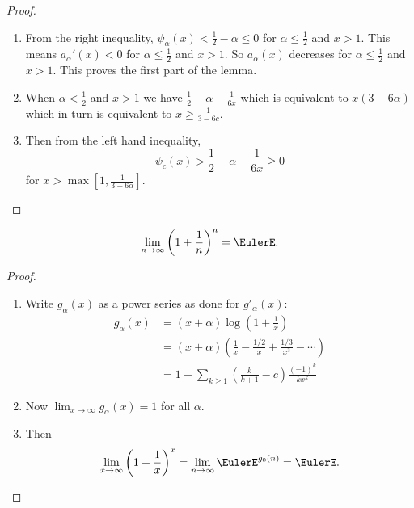 \documentclass[12pt]{article}
\begin{document}
\begin{proof}
\begin{enumerate}
        \item
            From the right inequality, \( \psi_{\alpha}(x) < \frac{1}{2}
            - \alpha \le 0 \) for \( \alpha \le \frac{1}{2} \) and \( x
            > 1 \).  This means \( a_{\alpha}'(x) < 0 \) for \( \alpha
            \le \frac{1}{2} \) and \( x > 1 \).  So \( a_{\alpha}(x) \)
            decreases for \( \alpha \le \frac{1}{2} \) and \( x > 1 \).
            This proves the first part of the lemma.
        \item
            When \( \alpha < \frac{1}{2} \) and \( x > 1 \) we have \(
            \frac{1}{2} - \alpha - \frac{1}{6x} \) which is equivalent
            to \( x(3 - 6 \alpha) \) which in turn is equivalent to \( x
            \ge \frac{1}{3 - 6c} \).
        \item
            Then from the left hand inequality,
            \[
                \psi_c(x) > \frac{1}{2} - \alpha - \frac{1}{6x} \ge 0
            \] for \( x > \max[1, \frac{1}{3-6\alpha}] \).
    \end{enumerate}
\end{proof}

\begin{corollary}
    \[
        \lim_{n \to \infty} \left( 1 + \frac{1}{n} \right)^n = \EulerE.
    \]
\end{corollary}

\begin{proof}
    \begin{enumerate}
        \item
            Write \( g_{\alpha}(x) \) as a power series as done for \(
            g'_{\alpha}(x) \):
            \begin{align*}
                g_{\alpha}(x) &= (x + \alpha) \log \left( 1 + \frac{1}{x}
                \right) \\
                &= (x + \alpha) \left(\frac{1}{x} - \frac{1/2}{x} + \frac{1/3}
                {x^3} - \cdots \right) \\
                &= 1 + \sum\limits_{k \ge 1} \left( \frac{k}{k+1} -c
                \right) \frac{(-1)^k}{k x^k}
            \end{align*}
        \item
            Now \( \lim_{x \to \infty} g_{\alpha}(x) = 1 \) for all \(
            \alpha \).
        \item
            Then
            \[
                \lim_{x \to \infty} \left( 1 + \frac{1}{x} \right)^x =
                \lim_{n \to \infty}\EulerE^{g_0(n)} = \EulerE.
            \]
    \end{enumerate}
\end{proof}
\end{document}
